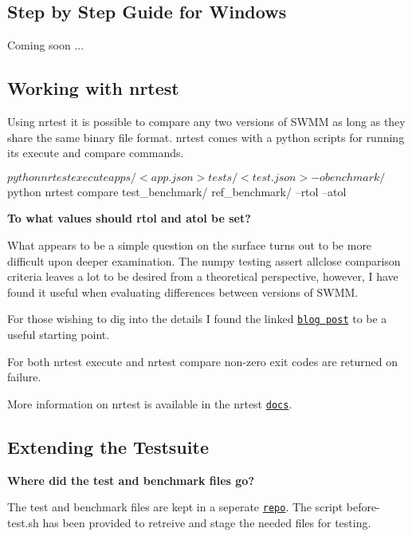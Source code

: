 \subsection*{Step by Step Guide for Windows}

Coming soon ...

\subsection*{Working with nrtest}

Using {\ttfamily nrtest} it is possible to compare any two versions of S\+W\+MM as long as they share the same binary file format. {\ttfamily nrtest} comes with a python scripts for running its {\ttfamily execute} and {\ttfamily compare} commands. 
\begin{DoxyCode}
$ python nrtest execute apps/<app.json> tests/<test.json> -o benchmark/
$ python nrtest compare test\_benchmark/ ref\_benchmark/ --rtol --atol
\end{DoxyCode}


{\bfseries To what values should rtol and atol be set?}

What appears to be a simple question on the surface turns out to be more difficult upon deeper examination. The numpy testing assert allclose comparison criteria leaves a lot to be desired from a theoretical perspective, however, I have found it useful when evaluating differences between versions of S\+W\+MM.

For those wishing to dig into the details I found the linked \href{https://randomascii.wordpress.com/2012/02/25/comparing-floating-point-numbers-2012-edition/}{\tt blog post} to be a useful starting point.

For both nrtest execute and nrtest compare non-\/zero exit codes are returned on failure.

More information on nrtest is available in the nrtest \href{https://nrtest.readthedocs.io/en/latest/}{\tt docs}.

\subsection*{Extending the Testsuite}

{\bfseries Where did the test and benchmark files go?}

The test and benchmark files are kept in a seperate \href{https://github.com/OpenWaterAnalytics/swmm-example-networks}{\tt repo}. The script before-\/test.\+sh has been provided to retreive and stage the needed files for testing.

